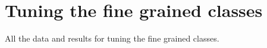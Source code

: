 \documentclass[ms]{nuthesis}
\begin{document}
\backmatter

\appendix

\chapter{Tuning the fine grained classes}
\par All the data and results for tuning the fine grained classes.

%


\nocite{*}


\end{document}
